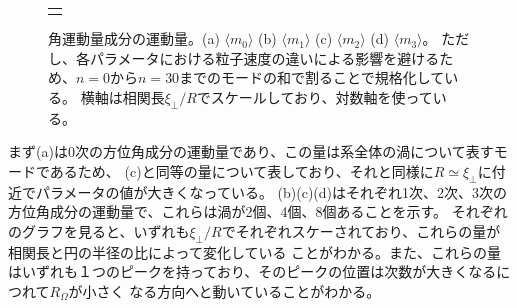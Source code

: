 \documentclass[/Users/ikedahajime/GitHub/reserch/master_report/thesis]{subfiles}
\begin{document}
\begin{figure}[htbp]
\begin{tabular}{c}
\begin{minipage}{0.24\hsize}
        \end{minipage}
    \end{tabular}
    \caption[Vel_modes]
    {
        角運動量成分の運動量。(a) $\langle m_0 \rangle$ (b) $\langle m_1 \rangle$ (c) $\langle m_2 \rangle$ (d) $\langle m_3 \rangle$。
        ただし、各パラメータにおける粒子速度の違いによる影響を避けるため、$n=0$から$n=30$までのモードの和で割ることで規格化している。
        横軸は相関長$\xi_\bot/R$\cite{kurodaLongrangeTranslationalOrder2024}でスケールしており、対数軸を使っている。
    }
    \label{fig:chiral_vel_modes}
\end{figure}

まず(a)は0次の方位角成分の運動量であり、この量は系全体の渦について表すモードであるため、
(c)と同等の量について表しており、それと同様に$R\simeq\xi_\bot$に付近でパラメータの値が大きくなっている。
(b)(c)(d)はそれぞれ1次、2次、3次の方位角成分の運動量で、これらは渦が2個、4個、8個あることを示す。
それぞれのグラフを見ると、いずれも$\xi_\bot/R$でそれぞれスケーされており、これらの量が相関長と円の半径の比によって変化している
ことがわかる。また、これらの量はいずれも１つのピークを持っており、そのピークの位置は次数が大きくなるにつれて$R_\Omega$が小さく
なる方向へと動いていることがわかる。

\ifSubfilesClassLoaded{
    \printbibliography[title=参考文献]
    }{}
\end{document}
